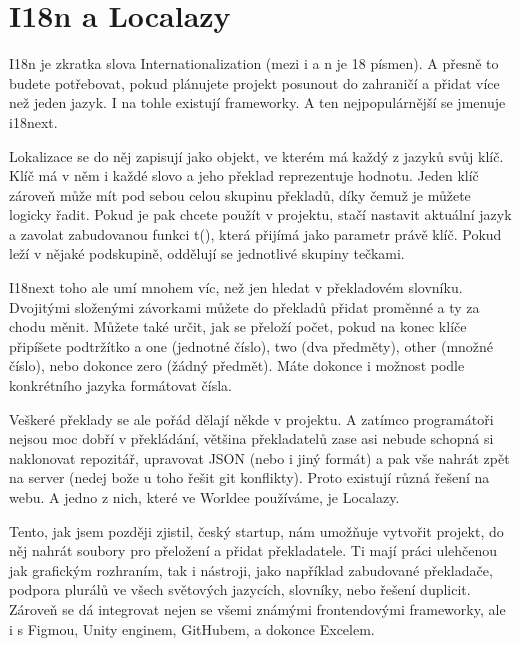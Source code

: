 \section{I18n a Localazy}

I18n je zkratka slova Internationalization (mezi i a n je 18 písmen)\cite{I18nMeaning}. A přesně to budete potřebovat, pokud plánujete projekt posunout do zahraničí a přidat více než jeden jazyk. I na tohle existují frameworky. A ten nejpopulárnější se jmenuje i18next\cite{I18nextDocs}.

Lokalizace se do něj zapisují jako objekt, ve kterém má každý z jazyků svůj klíč. Klíč má v něm i každé slovo a jeho překlad reprezentuje hodnotu. Jeden klíč zároveň může mít pod sebou celou skupinu překladů, díky čemuž je můžete logicky řadit. Pokud je pak chcete použít v projektu, stačí nastavit aktuální jazyk a zavolat zabudovanou funkci t(), která přijímá jako parametr právě klíč. Pokud leží v nějaké podskupině, oddělují se jednotlivé skupiny tečkami.

I18next toho ale umí mnohem víc, než jen hledat v překladovém slovníku\cite{I18nextVideo}. Dvojitými složenými závorkami můžete do překladů přidat proměnné a ty za chodu měnit. Můžete také určit, jak se přeloží počet, pokud na konec klíče připíšete podtržítko a one (jednotné číslo), two (dva předměty), other (množné číslo), nebo dokonce zero (žádný předmět). Máte dokonce i možnost podle konkrétního jazyka formátovat čísla.

Veškeré překlady se ale pořád dělají někde v projektu. A zatímco programátoři nejsou moc dobří v překládání, většina překladatelů zase asi nebude schopná si naklonovat repozitář, upravovat JSON (nebo i jiný formát) a pak vše nahrát zpět na server (nedej bože u toho řešit git konflikty). Proto existují různá řešení na webu. A jedno z nich, které ve Worldee používáme, je Localazy.

Tento, jak jsem později zjistil, český startup, nám umožňuje vytvořit projekt, do něj nahrát soubory pro přeložení a přidat překladatele. Ti mají práci ulehčenou jak grafickým rozhraním, tak i nástroji, jako například zabudované překladače, podpora plurálů ve všech světových jazycích, slovníky, nebo řešení duplicit\cite{LocalazyPricing}. Zároveň se dá integrovat nejen se všemi známými frontendovými frameworky, ale i s Figmou, Unity enginem, GitHubem, a dokonce Excelem\cite{LocalazyIntegration}.